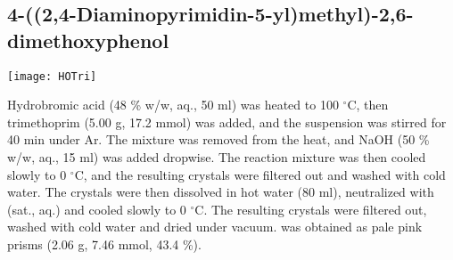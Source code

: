 \newpage


\subsection{4-((2,4-Diaminopyrimidin-5-yl)methyl)-2,6-dimethoxyphenol }


\begin{scheme}[H]
	\begin{center}
		\texttt{[image: HOTri]}
	\end{center}
\end{scheme}

Hydrobromic acid (48 \% w/w, aq., 50 ml) was heated to 100 $^{\circ}$C, then trimethoprim (5.00 g, 17.2 mmol) was added, and the suspension was stirred for 40 min under Ar. The mixture was removed from the heat, and NaOH (50 \% w/w, aq., 15 ml) was added dropwise. The reaction mixture was then cooled slowly to 0 $^{\circ}$C, and the resulting crystals were filtered out and washed with cold water. The crystals were then dissolved in hot water (80 ml), neutralized with  (sat., aq.) and cooled slowly to 0 $^{\circ}$C. The resulting crystals were filtered out, washed with cold water and dried under vacuum.  was obtained as pale pink prisms (2.06 g, 7.46 mmol, 43.4 \%).
\\[1\baselineskip]
\\[1\baselineskip]
\\[1\baselineskip]
